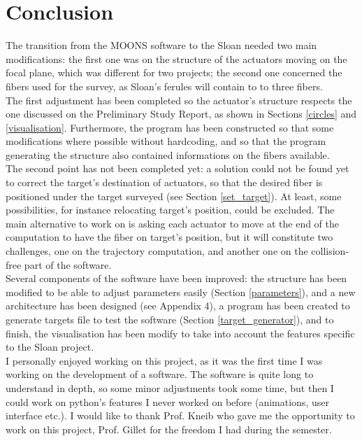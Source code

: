 \section{Conclusion} \label{conclusion}

The transition from the MOONS software to the Sloan needed two main modifications: the first one was on the structure of the actuators moving on the focal plane, which was different for two projects; the second one concerned the fibers used for the survey, as Sloan's ferules will contain to to three fibers. \\

The first adjustment has been completed so the actuator's structure respects the one discussed on the Preliminary Study Report\cite{study_report}, as shown in Sections \ref{circles} and \ref{visualisation}. Furthermore, the program has been constructed so that some modifications where possible without hardcoding, and so that the program generating the structure also contained informations on the fibers available.\\

The second point has not been completed yet: a solution could not be found yet to correct the target's destination of actuators, so that the desired fiber is positioned under the target surveyed (see Section \ref{set_target}). At least, some possibilities, for instance relocating target's position, could be excluded. The main alternative to work on is asking each actuator to move at the end of the computation to have the fiber on target's position, but it will constitute two challenges, one on the trajectory computation, and another one on the collision-free part of the software. \\

Several components of the software have been improved: the structure has been modified to be able to adjust parameters easily (Section \ref{parameters}), and a new architecture has been designed (see Appendix 4), a program has been created to generate targets file to test the software (Section \ref{target_generator}), and to finish, the visualisation has been modify to take into account the features specific to the Sloan project. \\

I personally enjoyed working on this project, as it was the first time I was working on the development of a software. The software is quite long to understand in depth, so some minor adjustments took some time, but then I could work on python's features I never worked on before (animations, user interface etc.). I would like to thank Prof. Kneib who gave me the opportunity to work on this project, Prof. Gillet for the freedom I had during the semester. 